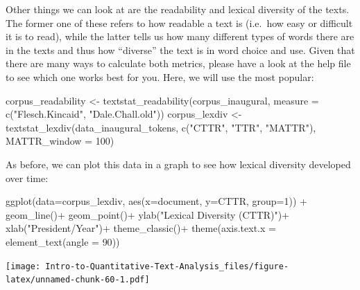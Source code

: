 \documentclass[
]{article}
\newenvironment{Shaded}{\begin{snugshade}}{\end{snugshade}}
\newcommand{\AttributeTok}[1]{\textcolor[rgb]{0.77,0.63,0.00}{#1}}
\newcommand{\DecValTok}[1]{\textcolor[rgb]{0.00,0.00,0.81}{#1}}
\newcommand{\FunctionTok}[1]{\textcolor[rgb]{0.00,0.00,0.00}{#1}}
\newcommand{\NormalTok}[1]{#1}
\newcommand{\OtherTok}[1]{\textcolor[rgb]{0.56,0.35,0.01}{#1}}
\newcommand{\SpecialCharTok}[1]{\textcolor[rgb]{0.00,0.00,0.00}{#1}}
\newcommand{\StringTok}[1]{\textcolor[rgb]{0.31,0.60,0.02}{#1}}
\begin{document}
Other things we can look at are the readability and lexical diversity of the texts. The former one of these refers to how readable a text is (i.e.~how easy or difficult it is to read), while the latter tells us how many different types of words there are in the texts and thus how ``diverse'' the text is in word choice and use. Given that there are many ways to calculate both metrics, please have a look at the help file to see which one works best for you. Here, we will use the most popular:

\begin{Shaded}
\begin{Highlighting}[]
\NormalTok{corpus\_readability }\OtherTok{\textless{}{-}} \FunctionTok{textstat\_readability}\NormalTok{(corpus\_inaugural, }\AttributeTok{measure =} \FunctionTok{c}\NormalTok{(}\StringTok{"Flesch.Kincaid"}\NormalTok{, }\StringTok{"Dale.Chall.old"}\NormalTok{))}
\NormalTok{corpus\_lexdiv }\OtherTok{\textless{}{-}} \FunctionTok{textstat\_lexdiv}\NormalTok{(data\_inaugural\_tokens, }\FunctionTok{c}\NormalTok{(}\StringTok{"CTTR"}\NormalTok{, }\StringTok{"TTR"}\NormalTok{, }\StringTok{"MATTR"}\NormalTok{), }\AttributeTok{MATTR\_window =} \DecValTok{100}\NormalTok{)}
\end{Highlighting}
\end{Shaded}

As before, we can plot this data in a graph to see how lexical diversity developed over time:

\begin{Shaded}
\begin{Highlighting}[]
\FunctionTok{ggplot}\NormalTok{(}\AttributeTok{data=}\NormalTok{corpus\_lexdiv, }\FunctionTok{aes}\NormalTok{(}\AttributeTok{x=}\NormalTok{document, }\AttributeTok{y=}\NormalTok{CTTR, }\AttributeTok{group=}\DecValTok{1}\NormalTok{)) }\SpecialCharTok{+}
 \FunctionTok{geom\_line}\NormalTok{()}\SpecialCharTok{+}
 \FunctionTok{geom\_point}\NormalTok{()}\SpecialCharTok{+}
 \FunctionTok{ylab}\NormalTok{(}\StringTok{"Lexical Diversity (CTTR)"}\NormalTok{)}\SpecialCharTok{+}
 \FunctionTok{xlab}\NormalTok{(}\StringTok{"President/Year"}\NormalTok{)}\SpecialCharTok{+}
 \FunctionTok{theme\_classic}\NormalTok{()}\SpecialCharTok{+}
 \FunctionTok{theme}\NormalTok{(}\AttributeTok{axis.text.x =} \FunctionTok{element\_text}\NormalTok{(}\AttributeTok{angle =} \DecValTok{90}\NormalTok{))}
\end{Highlighting}
\end{Shaded}

\texttt{[image: Intro-to-Quantitative-Text-Analysis\_files/figure-latex/unnamed-chunk-60-1.pdf]}
\end{document}
